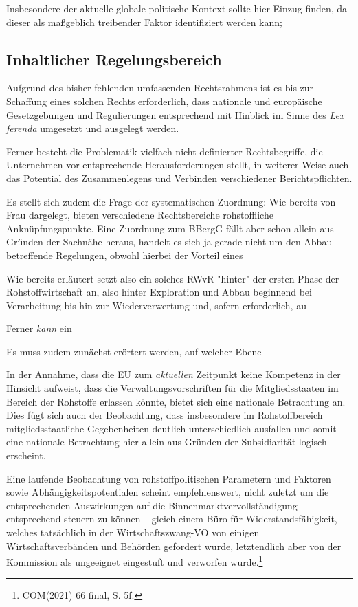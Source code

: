 \documentclass[12pt,a4paper,oneside]{book} %
\begin{document}
Insbesondere der aktuelle globale politische Kontext sollte hier Einzug finden, da dieser als maßgeblich treibender Faktor identifiziert werden kann; 

\subsection{Inhaltlicher Regelungsbereich}



Aufgrund des bisher fehlenden umfassenden Rechtsrahmens ist es bis zur Schaffung eines solchen Rechts erforderlich, dass nationale und europäische Gesetzgebungen und Regulierungen entsprechend mit Hinblick im Sinne des \textit{Lex ferenda} umgesetzt und ausgelegt werden. 

Ferner besteht die Problematik vielfach nicht definierter Rechtsbegriffe, die Unternehmen vor entsprechende Herausforderungen stellt, in weiterer Weise auch das Potential des Zusammenlegens und Verbinden verschiedener Berichtspflichten.\autocite{Schäffer, EuZW 2023, 695, 700}

Es stellt sich zudem die Frage der systematischen Zuordnung: Wie bereits von Frau \autocite{frau2023} dargelegt, bieten verschiedene Rechtsbereiche rohstoffliche Anknüpfungspunkte. Eine Zuordnung zum BBergG fällt aber schon allein aus Gründen der Sachnähe heraus, handelt es sich ja gerade nicht um den Abbau betreffende Regelungen, obwohl hierbei der Vorteil eines

Wie bereits erläutert setzt also ein solches RWvR "hinter" der ersten Phase der Rohstoffwirtschaft an, also hinter Exploration und Abbau beginnend bei Verarbeitung bis hin zur Wiederverwertung und, sofern erforderlich, au

Ferner \textit{kann} ein 

Es muss zudem zunächst erörtert werden, auf welcher Ebene

In der Annahme, dass die EU zum \textit{aktuellen} Zeitpunkt keine Kompetenz in der Hinsicht aufweist, dass die Verwaltungsvorschriften für die Mitgliedsstaaten im Bereich der Rohstoffe erlassen könnte, bietet sich eine nationale Betrachtung an. Dies fügt sich auch der Beobachtung, dass insbesondere im Rohstoffbereich mitgliedsstaatliche Gegebenheiten deutlich unterschiedlich ausfallen und somit eine nationale Betrachtung hier allein aus Gründen der Subsidiarität logisch erscheint.

Eine laufende Beobachtung von rohstoffpolitischen Parametern und Faktoren sowie Abhängigkeitspotentialen scheint empfehlenswert, nicht zuletzt um die entsprechenden Auswirkungen auf die Binnenmarktvervollständigung entsprechend steuern zu können -- gleich einem \glqq Büro für Widerstandsfähigkeit\grqq, welches tatsächlich in der Wirtschaftszwang-VO von einigen Wirtschaftsverbänden und Behörden gefordert wurde, letztendlich aber von der Kommission als ungeeignet eingestuft und verworfen wurde.\footnote{COM(2021) 66 final, S. 5f.}
\end{document}
